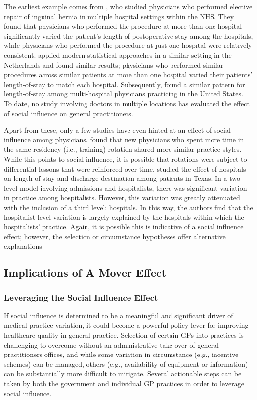 \documentclass[12pt]{article}
\begin{document}
The earliest example comes from \citet{griffithsVariationHospitalStay1979}, who studied physicians who performed elective repair of inguinal hernia in multiple hospital settings within the NHS. They found that physicians who performed the procedure at more than one hospital significantly varied the patient's length of postoperative stay among the hospitals, while physicians who performed the procedure at just one hospital were relatively consistent. \citet{westertVariationDurationHospital1993} applied modern statistical approaches in a similar setting in the Netherlands and found similar results; physicians who performed similar procedures across similar patients at more than one hospital varied their patients' length-of-stay to match each hospital. Subsequently, \citet{jongVariationHospitalLength2006} found a similar pattern for length-of-stay among multi-hospital physicians practicing in the United States. To date, no study involving doctors in multiple locations has evaluated the effect of social influence on general practitioners.

Apart from these, only a few studies have even hinted at an effect of social influence among physicians. \citet{chungHowResidentsLearn2003} found that new physicians who spent more time in the same residency (i.e., training) rotation shared more similar practice styles. While this points to social influence, it is possible that rotations were subject to differential lessons that were reinforced over time. \citet{goodwinVariationLengthStay2013} studied the effect of hospitals on length of stay and discharge destination among patients in Texas. In a two-level model involving admissions and hospitalists, there was significant variation in practice among hospitalists. However, this variation was greatly attenuated with the inclusion of a third level: hospitals. In this way, the authors find that the hospitalist-level variation is largely explained by the hospitals within which the hospitalists' practice. Again, it is possible this is indicative of a social influence effect; however, the selection or circumstance hypotheses offer alternative explanations.


\subsection{Implications of A Mover Effect}
\subsubsection{Leveraging the Social Influence Effect}
If social influence is determined to be a meaningful and significant driver of medical practice variation, it could become a powerful policy lever for improving healthcare quality in general practice. Selection of certain GPs into practices is challenging to overcome without an administrative take-over of general practitioners offices, and while some variation in circumstance (e.g., incentive schemes) can be managed, others (e.g., availability of equipment or information) can be substantially more difficult to mitigate. Several actionable steps can be taken by both the government and individual GP practices in order to leverage social influence.
\end{document}
